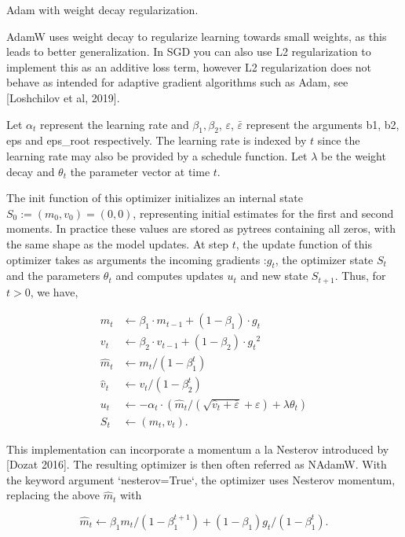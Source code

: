 Adam with weight decay regularization.

AdamW uses weight decay to regularize learning towards small weights, as this leads to better generalization. In SGD you can also use L2 regularization to implement this as an additive loss term, however L2 regularization does not behave as intended for adaptive gradient algorithms such as Adam, see [Loshchilov et al, 2019].

Let $\alpha_t$ represent the learning rate and $\beta_1, \beta_2$,
$\varepsilon$, $\bar{\varepsilon}$  represent the arguments
b1, b2, eps and eps\_root respectively. The learning rate is
indexed by $t$ since the learning rate may also be provided by a
schedule function. Let $\lambda$ be the weight decay and 
$\theta_t$ the parameter vector at time $t$.

The init function of this optimizer initializes an internal state
$S_0 := (m_0, v_0) = (0, 0)$, representing initial estimates for the
first and second moments. In practice these values are stored as pytrees containing all zeros, with the same shape as the model updates.
At step $t$, the update function of this optimizer takes as
arguments the incoming gradients :$g_t$, the optimizer state $S_t$ 
and the parameters $\theta_t$ and computes updates $u_t$ and 
new state $S_{t+1}$. Thus, for $t > 0$, we have,

\begin{align*}
  m_t &\leftarrow \beta_1 \cdot m_{t-1} + (1-\beta_1) \cdot g_t \\
  v_t &\leftarrow \beta_2 \cdot v_{t-1} + (1-\beta_2) \cdot {g_t}^2 \\
  \hat{m}_t &\leftarrow m_t / {(1-\beta_1^t)} \\
  \hat{v}_t &\leftarrow v_t / {(1-\beta_2^t)} \\
  u_t &\leftarrow -\alpha_t \cdot \left( \hat{m}_t / \left({\sqrt{\hat{v}_t 
  + \bar{\varepsilon}} + \varepsilon} \right) + \lambda \theta_{t} \right)\\
  S_t &\leftarrow (m_t, v_t).
\end{align*}

This implementation can incorporate a momentum a la Nesterov introduced by [Dozat 2016]. The resulting optimizer is then often referred as NAdamW. With the keyword argument `nesterov=True`, the optimizer uses Nesterov momentum, replacing the above $\hat{m}_t$ with

 \begin{equation*}
    \hat{m}_t \leftarrow
    \beta_1 m_t / {(1-\beta_1^{t+1})} + (1 - \beta_1) g_t / {(1-\beta_1^t)}. 
 \end{equation*}


